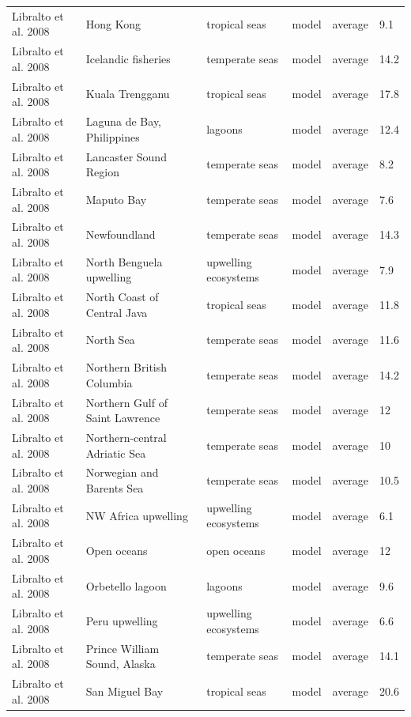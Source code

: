 \documentclass[oneside,12pt,final]{sty/ucthesis-CA2012}
\begin{document}
\begin{mainmatter}
\begin{longtable} {p{4cm}p{3cm}p{2cm}lp{2cm}p{2cm}}
    Libralto et al. 2008  & Hong Kong & tropical seas & model & average & 9.1 \\
    Libralto et al. 2008   & Icelandic fisheries & temperate seas & model & average & 14.2 \\
    Libralto et al. 2008   & Kuala Trengganu & tropical seas & model & average & 17.8 \\
    Libralto et al. 2008   & Laguna de Bay, Philippines & lagoons & model & average & 12.4 \\
    Libralto et al. 2008  & Lancaster Sound Region & temperate seas & model & average & 8.2 \\
    Libralto et al. 2008   & Maputo Bay & temperate seas & model & average & 7.6 \\
    Libralto et al. 2008   & Newfoundland & temperate seas & model & average & 14.3 \\
    Libralto et al. 2008  &  North Benguela upwelling & upwelling ecosystems & model & average & 7.9 \\
    Libralto et al. 2008 & North Coast of Central Java & tropical seas & model & average & 11.8 \\
    Libralto et al. 2008   & North Sea & temperate seas & model & average & 11.6 \\
    Libralto et al. 2008  & Northern British Columbia & temperate seas & model & average & 14.2 \\
    Libralto et al. 2008   & Northern Gulf of Saint Lawrence  & temperate seas & model & average & 12 \\
    Libralto et al.  2008   & Northern-central Adriatic Sea  & temperate seas & model & average & 10 \\
    Libralto et al. 2008  & Norwegian and Barents Sea & temperate seas & model & average & 10.5 \\
    Libralto et al. 2008  & NW Africa upwelling & upwelling ecosystems & model & average & 6.1 \\
    Libralto et al. 2008  & Open oceans & open oceans & model & average & 12 \\
    Libralto et al. 2008   & Orbetello lagoon & lagoons & model & average & 9.6 \\
    Libralto et al. 2008   & Peru upwelling & upwelling ecosystems & model & average & 6.6 \\
    Libralto et al. 2008   & Prince William Sound, Alaska & temperate seas & model & average & 14.1 \\
    Libralto et al. 2008  & San Miguel Bay & tropical seas & model & average & 20.6 \\

\end{longtable}
\end{mainmatter}
\end{document}
